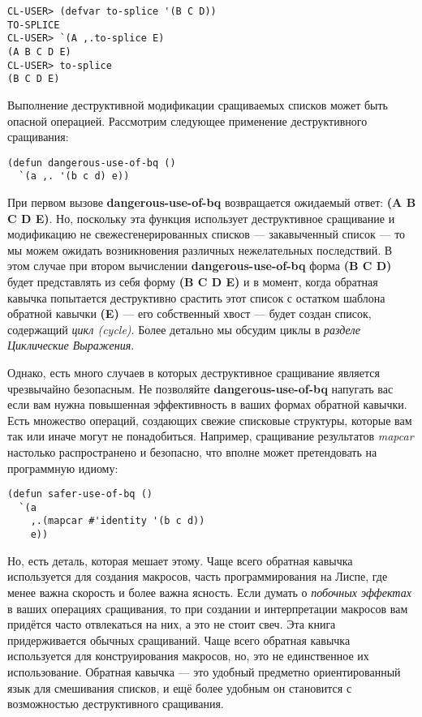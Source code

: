 \begin{verbatim}
CL-USER> (defvar to-splice '(B C D))
TO-SPLICE
CL-USER> `(A ,.to-splice E)
(A B C D E)
CL-USER> to-splice
(B C D E)
\end{verbatim}

Выполнение де\-струк\-тив\-ной модификации сращиваемых списков может быть опасной операцией. Рассмотрим следующее применение деструктивного сращивания:

\begin{verbatim}
(defun dangerous-use-of-bq ()
  `(a ,. '(b c d) e))
\end{verbatim}

При первом вызове \textbf{dangerous-use-of-bq} возвращается ожидаемый ответ: \textbf{(A B C D E)}. Но, поскольку эта функция использует деструктивное сращивание и модификацию не свежесгенерированных списков --- закавыченный список --- то мы можем ожидать возникновения различных нежелательных последствий. В этом случае при втором вычислении \textbf{dangerous-use-of-bq} форма \textbf{(B C D)} будет представлять из себя форму \textbf{(B C D E)} и в момент, когда обратная кавычка попытается деструктивно срастить этот список с остатком шаблона обратной кавычки \textbf{(E)} --- его собственный хвост --- будет создан список, содержащий \emph{цикл (cycle)}. Более детально мы обсудим циклы в \emph{разделе Циклические Выражения}.

Однако, есть много случаев в которых деструктивное сращивание является чрезвычайно безопасным. Не позволяйте \textbf{dangerous-use-of-bq} напугать вас если вам нужна повышенная эффективность в ваших формах обратной кавычки. Есть множество операций, создающих свежие списковые структуры, которые вам так или иначе могут не понадобиться. Например, сращивание результатов \emph{mapcar} настолько распространено и безопасно, что вполне может претендовать на программную идиому:

\begin{verbatim}
(defun safer-use-of-bq ()
  `(a
    ,.(mapcar #'identity '(b c d))
    e))
\end{verbatim}

Но, есть деталь, которая мешает этому. Чаще всего обратная кавычка используется для создания макросов, часть программирования на Лиспе, где менее важна скорость и более важна ясность. Если думать о \emph{побочных эффектах} в ваших операциях сращивания, то при создании и интерпретации макросов вам придётся часто отвлекаться на них, а это не стоит свеч. Эта книга придерживается обычных сращиваний. Чаще всего обратная кавычка используется для конструирования макросов, но, это не единственное их использование. Обратная кавычка --- это удобный предметно ориентированный язык для смешивания списков, и ещё более удобным он становится с возможностью деструктивного сращивания.

